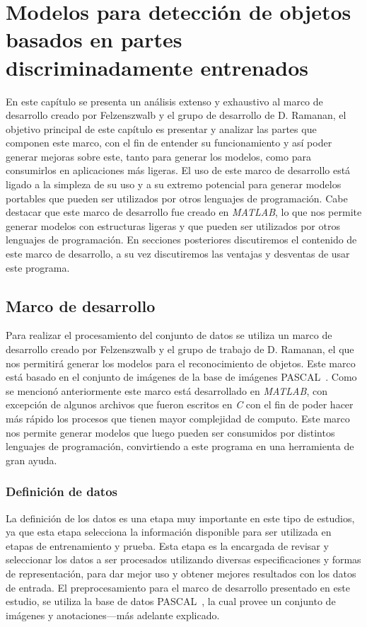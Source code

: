\chapter[Modelos basados en partes ]{Modelos para detección de objetos basados en partes discriminadamente entrenados }\label{ch:capitulo4}
En este capítulo se presenta un análisis extenso y exhaustivo al marco de desarrollo creado por Felzenszwalb y el grupo de desarrollo de D. Ramanan, el objetivo principal de este capítulo es presentar y analizar las partes que componen este marco, con el fin de entender su funcionamiento y así poder generar mejoras sobre este, tanto para generar los modelos, como para consumirlos en aplicaciones más ligeras. El uso de este marco de desarrollo está ligado a la simpleza de su uso y a su extremo potencial para generar modelos portables que pueden ser utilizados por otros lenguajes de programación. Cabe destacar que este marco de desarrollo fue creado en \textit{MATLAB}, lo que nos permite generar modelos con estructuras ligeras y que pueden ser utilizados por otros lenguajes de programación. En secciones posteriores discutiremos el contenido de este marco de desarrollo, a su vez discutiremos las ventajas y desventas de usar este programa.

\section{Marco de desarrollo}\label{sec:framework}
Para realizar el procesamiento del conjunto de datos se utiliza un marco de desarrollo creado por Felzenszwalb y el grupo de trabajo de D. Ramanan, el que nos permitirá generar los modelos para el reconocimiento de objetos. Este marco está basado en el conjunto de imágenes de la base de imágenes PASCAL~\cite{Everingham2010}. Como se mencionó anteriormente este marco está desarrollado en \textit{MATLAB}, con excepción de algunos archivos que fueron escritos en \textit{C} con el fin de poder hacer más rápido los procesos que tienen mayor complejidad de computo. Este marco nos permite generar modelos que luego pueden ser consumidos por distintos lenguajes de programación, convirtiendo a este programa en una herramienta de gran ayuda.

\subsection{Definición de datos}\label{sec:datos}
La definición de los datos es una etapa muy importante en este tipo de estudios, ya que esta etapa selecciona la información disponible para ser utilizada en etapas de entrenamiento y prueba. Esta etapa es la encargada de revisar y seleccionar los datos a ser procesados utilizando diversas especificaciones y formas de representación, para dar mejor uso y obtener mejores resultados con los datos de entrada. El preprocesamiento para el marco de desarrollo presentado en este estudio, se utiliza la base de datos PASCAL~\cite{Everingham2010}, la cual provee un conjunto de imágenes y anotaciones---más adelante explicado.

